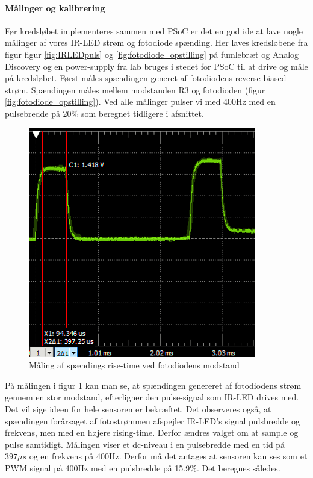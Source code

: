 \paragraph{Målinger og kalibrering}
\newline
\newline
Før kredsløbet implementeres sammen med PSoC er det en god ide at lave nogle målinger af vores IR-LED strøm og fotodiode spænding. Her laves kredsløbene fra figur figur \ref{fig:IRLEDpuls} og \ref{fig:fotodiode_opstilling} på fumlebræt og Analog Discovery og en power-supply fra lab bruges i stedet for PSoC til at drive og måle på kredsløbet. Først måles spændingen generet af fotodiodens reverse-biased strøm. Spændingen måles mellem modstanden R3 og fotodioden (figur \ref{fig:fotodiode_opstilling}). Ved alle målinger pulser vi med 400Hz med en pulsebredde på 20\% som beregnet tidligere i afsnittet.
\begin{figure}[H]
    \centering
    \includegraphics{Rapport/BallDispenser/BallCountSensor/graphics/Maling1.png}
    \caption{Måling af spændings rise-time ved fotodiodens modstand}
    \label{fig:Måling1_AD}
\end{figure}
På målingen i figur \ref{fig:Måling1_AD} kan man se, at spændingen genereret af fotodiodens strøm gennem en stor modstand, efterligner den pulse-signal som IR-LED drives med. Det vil sige ideen for hele sensoren er bekræftet. Det observeres også, at spændingen forårsaget af fotostrømmen afspejler IR-LED's signal pulsbredde og frekvens, men med en højere rising-time. Derfor ændres valget om at sample og pulse samtidigt. Målingen viser et dc-niveau i en pulsebredde med en tid på $397\mu s$ og en frekvens på 400Hz. Derfor må det antages at sensoren kan ses som et PWM signal på 400Hz med en pulsbredde på 15.9\%. Det beregnes således.
